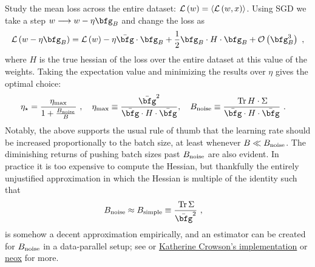 \documentclass[11pt]{article}
\begin{document}
Study the mean loss across the entire dataset: $ \mathcal{L} \left ( w \right ) = \langle
	\mathcal{L} \left ( w, x \right) \rangle$. Using SGD we take a step $ w \longrightarrow w -\eta \bfg _{ B }   $
and change the loss as
\begin{align}
	\Lcal \left ( w -\eta \bfg _{ B } \right )  = \Lcal \left ( w  \right ) -\eta \bar{\bfg }\cdot
	\bfg _{ B } + \frac{ 1 }{ 2 } \bfg _{ B }\cdot  H \cdot  \bfg _{ B } + \Ocal \left( \bfg _{ B }
	^{ 3 } \right)\ ,
\end{align}
where $ H $ is the true hessian of the loss over the entire dataset at this value of the weights.
Taking the expectation value and minimizing the results  over $ \eta  $ gives the optimal choice:
\begin{align}
	\eta _{ \star } & = \frac{ \eta _{ {\rm  max} } }{ 1 + \frac{ B _{ {\rm  noise} } }{ B } }\ , \quad  \eta _{ {\rm  max} }\equiv \frac{ \bar{\bfg } ^{ 2 } }{ \bar{\bfg }\cdot  H \cdot  \bar{\bfg } } , \quad  B _{ {\rm  noise} } \equiv \frac{ \Tr H \cdot \Sigma  }{  \bar{\bfg }\cdot  H \cdot  \bar{\bfg }}\ .
\end{align}
Notably, the above supports the usual rule of thumb that the learning rate should be increased
proportionally to the batch size, at least whenever $ B \ll B _{ {\rm  noise} } $. The diminishing
returns of pushing batch sizes past $ B _{ {\rm noise} } $ are also evident. In practice it is too
expensive to compute the Hessian, but thankfully the entirely unjustified approximation in which the
Hessian is multiple of the identity such that
\begin{align}
	B _{ {\rm noise} } & \approx B _{ {\rm  simple} } \equiv \frac{ \Tr \Sigma  }{ \bar{\bfg } ^{ 2 } }\ ,
\end{align}
is somehow a decent approximation empirically, and an estimator can be created for $ B _{ {\rm noise} } $
in a data-parallel setup; see \cite{mccandlish2018empirical} or
\href{https://github.com/crowsonkb/k-diffusion/blob/ab527a9a6d347f364e3d185ba6d714e22d80cb3c/k_diffusion/gns.py#L1}{Katherine
	Crowson's implementation} or \href{https://github.com/EleutherAI/gpt-neox/blob/408e29d9c746a02d842917bb7447c5c4be0b42d4/megatron/gradient_noise_scale/gradient_noise_scale.py#L1}{neox} for more.
\end{document}
